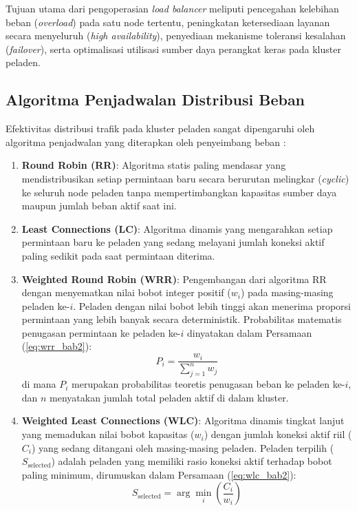 Tujuan utama dari pengoperasian \textit{load balancer} meliputi pencegahan kelebihan beban (\textit{overload}) pada satu node tertentu, peningkatan ketersediaan layanan secara menyeluruh (\textit{high availability}), penyediaan mekanisme toleransi kesalahan (\textit{failover}), serta optimalisasi utilisasi sumber daya perangkat keras pada kluster peladen.

\subsection{Algoritma Penjadwalan Distribusi Beban}
Efektivitas distribusi trafik pada kluster peladen sangat dipengaruhi oleh algoritma penjadwalan yang diterapkan oleh penyeimbang beban \citep{buke2026load, sakib2025dynamic}:
\begin{enumerate}
    \item \textbf{Round Robin (RR)}: Algoritma statis paling mendasar yang mendistribusikan setiap permintaan baru secara berurutan melingkar (\textit{cyclic}) ke seluruh node peladen tanpa mempertimbangkan kapasitas sumber daya maupun jumlah beban aktif saat ini.
    \item \textbf{Least Connections (LC)}: Algoritma dinamis yang mengarahkan setiap permintaan baru ke peladen yang sedang melayani jumlah koneksi aktif paling sedikit pada saat permintaan diterima.
    \item \textbf{Weighted Round Robin (WRR)}: Pengembangan dari algoritma RR dengan menyematkan nilai bobot integer positif ($w_i$) pada masing-masing peladen ke-$i$. Peladen dengan nilai bobot lebih tinggi akan menerima proporsi permintaan yang lebih banyak secara deterministik. Probabilitas matematis penugasan permintaan ke peladen ke-$i$ dinyatakan dalam Persamaan (\ref{eq:wrr_bab2}):
    \begin{equation}
        P_i = \frac{w_i}{\sum_{j=1}^{n} w_j}
        \label{eq:wrr_bab2}
    \end{equation}
    di mana $P_i$ merupakan probabilitas teoretis penugasan beban ke peladen ke-$i$, dan $n$ menyatakan jumlah total peladen aktif di dalam kluster.
    \item \textbf{Weighted Least Connections (WLC)}: Algoritma dinamis tingkat lanjut yang memadukan nilai bobot kapasitas ($w_i$) dengan jumlah koneksi aktif riil ($C_i$) yang sedang ditangani oleh masing-masing peladen. Peladen terpilih ($S_{\text{selected}}$) adalah peladen yang memiliki rasio koneksi aktif terhadap bobot paling minimum, dirumuskan dalam Persamaan (\ref{eq:wlc_bab2}):
    \begin{equation}
        S_{\text{selected}} = \arg\min_{i} \left( \frac{C_i}{w_i} \right)
        \label{eq:wlc_bab2}
    \end{equation}
\end{enumerate}

